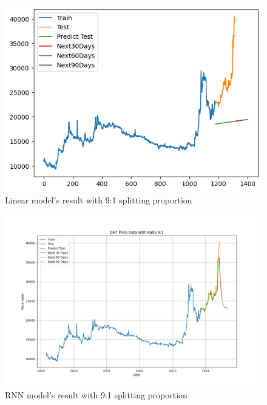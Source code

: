 \documentclass{ieeeojies}
\begin{document}
\begin{figure}[H]
  \centering
  \begin{minipage}{0.8\linewidth}
    \centering
    \includegraphics[width=\linewidth]{bibliography/Figure/LN_DHT(9_1).png}
    \caption{Linear model's result with 9:1 splitting proportion}
    \label{fig8}
  \end{minipage}
\end{figure}

\begin{figure}[H]
  \centering
  \begin{minipage}{0.8\linewidth}
    \centering
    \includegraphics[width=\linewidth]{bibliography/Figure/RNN_91_DHT.png}
    \caption{RNN model's result with 9:1 splitting proportion}
    \label{fig8}
  \end{minipage}
\end{figure}
\end{document}
